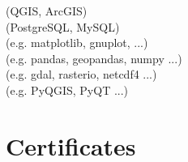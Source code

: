 \documentclass[%
doublesided,
paper=a4,
fontsize=10pt
]{my-resume}
\begin{document}
{		\vspace{0.5em}
            \textcolor{highlightbarfontcolor}{(QGIS, ArcGIS)}\\
            \textcolor{highlightbarfontcolor}{(PostgreSQL, MySQL)}\\
		\textcolor{highlightbarfontcolor}{(e.g. matplotlib, gnuplot, ...)}\\
            \textcolor{highlightbarfontcolor}{(e.g. pandas, geopandas, numpy ...)}\\
            \textcolor{highlightbarfontcolor}{(e.g. gdal, rasterio, netcdf4 ...)}\\
            \textcolor{highlightbarfontcolor}{(e.g. PyQGIS, PyQT ...)}\\
		
		
		\vspace{0.5em}
		\bigskip
		
		\section{Certificates}
		
		
	}
\end{document}
